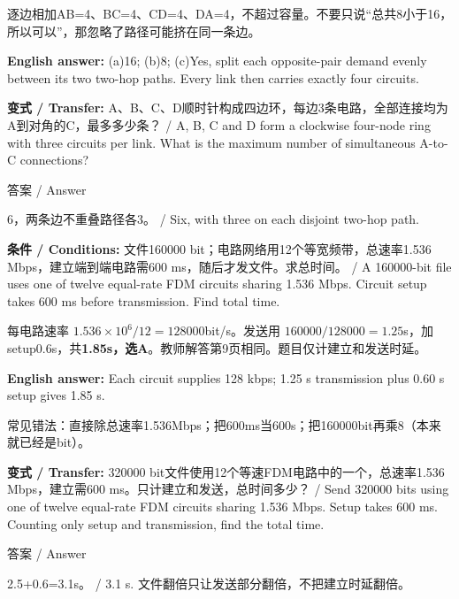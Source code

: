 逐边相加AB=4、BC=4、CD=4、DA=4，不超过容量。不要只说“总共8小于16，所以可以”，那忽略了路径可能挤在同一条边。


\textbf{English answer:} (a)16; (b)8; (c)Yes, split each opposite-pair demand evenly between its two two-hop paths. Every link then carries exactly four circuits.


\textbf{变式 / Transfer:} A、B、C、D顺时针构成四边环，每边3条电路，全部连接均为A到对角的C，最多多少条？ / A, B, C and D form a clockwise four-node ring with three circuits per link. What is the maximum number of simultaneous A-to-C connections?



\begin{StudySolution}{答案 / Answer}


6，两条边不重叠路径各3。 / Six, with three on each disjoint two-hop path.


\end{StudySolution}








\textbf{条件 / Conditions:} 文件160000 bit；电路网络用12个等宽频带，总速率1.536 Mbps，建立端到端电路需600 ms，随后才发文件。求总时间。 / A 160000-bit file uses one of twelve equal-rate FDM circuits sharing 1.536 Mbps. Circuit setup takes 600 ms before transmission. Find total time.


每电路速率 \(1.536\times10^6/12=128000\)bit/s。发送用 \(160000/128000=1.25\)s，加setup0.6s，共\textbf{1.85s，选A}。教师解答第9页相同。题目仅计建立和发送时延。


\textbf{English answer:} Each circuit supplies 128 kbps; 1.25 s transmission plus 0.60 s setup gives 1.85 s.


常见错法：直接除总速率1.536Mbps；把600ms当600s；把160000bit再乘8（本来就已经是bit）。


\textbf{变式 / Transfer:} 320000 bit文件使用12个等速FDM电路中的一个，总速率1.536 Mbps，建立需600 ms。只计建立和发送，总时间多少？ / Send 320000 bits using one of twelve equal-rate FDM circuits sharing 1.536 Mbps. Setup takes 600 ms. Counting only setup and transmission, find the total time.



\begin{StudySolution}{答案 / Answer}


2.5+0.6=3.1s。 / 3.1 s. 文件翻倍只让发送部分翻倍，不把建立时延翻倍。


\end{StudySolution}






